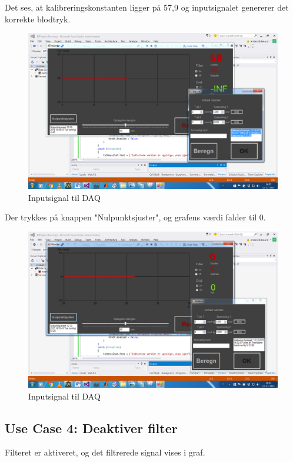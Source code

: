 Det ses, at kalibreringskonstanten ligger på 57,9 og inputsignalet genererer det korrekte blodtryk.
\begin{figure}[H]
	\centering
	\includegraphics[width=1\textwidth]{Figurer/Test_Nul_2}
	\caption{Inputsignal til DAQ}
\end{figure}

Der trykkes på knappen "Nulpunktsjuster", og grafens værdi falder til 0. 

\begin{figure}[H]
	\centering
	\includegraphics[width=1\textwidth]{Figurer/Test_Nul_3}
	\caption{Inputsignal til DAQ}
\end{figure}


\subsection{Use Case 4: Deaktiver filter}

Filteret er aktiveret, og det filtrerede signal vises i graf.

